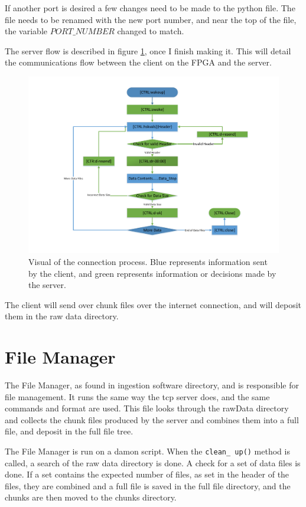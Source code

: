 \documentclass{article}
\begin{document}
If another port is desired a few changes need to be made to the python file. The file needs to be renamed with the new port number, and near the top of the file, the variable $PORT\_ NUMBER$ changed to match.

The server flow is described in figure \ref{fig:serverFlow}, once I finish making it. This will detail the communications flow between the client on the FPGA and the server. 

\begin{figure}
\includegraphics[width=1.5\textwidth,left]{./SeverFlowChart.pdf}
\caption{Visual of the connection process. Blue represents information sent by the client, and green represents information or decisions made by the server.}
\label{fig:serverFlow}
\end{figure}


The client will send over chunk files over the internet connection, and will deposit them in the raw data directory. 
\section{File Manager}

The File Manager, as found in ingestion software directory, and is responsible for file management. It runs the same way the tcp server does, and the same commands and format are used. This file looks through the rawData directory and collects the chunk files produced by the server and combines them into a full file, and deposit in the full file tree.

The File Manager is run on a damon script. When the \texttt{clean\_ up()} method is called, a search of the raw data directory is done. A check for a set of data files is done. If a set contains the expected number of files, as set in the header of the files, they are combined and a full file is saved in the full file directory, and the chunks are then moved to the chunks directory. 
\end{document}
